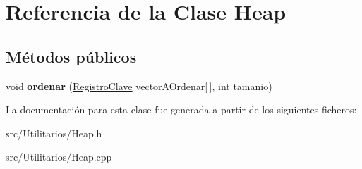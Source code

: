 \hypertarget{class_heap}{\section{\-Referencia de la \-Clase \-Heap}
\label{class_heap}
}
\subsection*{\-Métodos públicos}
\begin{DoxyCompactItemize}
\item 
\hypertarget{class_heap_a4ef636892b60a862374aa7e51fea8a3e}{void {\bfseries ordenar} (\hyperlink{class_registro_clave}{\-Registro\-Clave} vector\-A\-Ordenar\mbox{[}$\,$\mbox{]}, int tamanio)}\label{class_heap_a4ef636892b60a862374aa7e51fea8a3e}

\end{DoxyCompactItemize}


\-La documentación para esta clase fue generada a partir de los siguientes ficheros\-:\begin{DoxyCompactItemize}
\item 
src/\-Utilitarios/\-Heap.\-h\item 
src/\-Utilitarios/\-Heap.\-cpp\end{DoxyCompactItemize}
